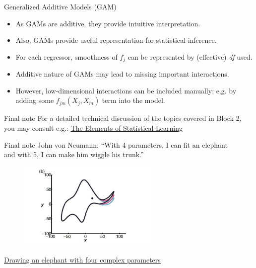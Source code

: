 \documentclass{beamer}
\begin{document}
\begin{frame}{Generalized Additive Models (GAM)}
\begin{itemize}
    \item[\ding{51}] As GAMs are additive, they provide intuitive interpretation. 
    \bigskip
    \item[\ding{51}] Also, GAMs provide useful representation for statistical inference.
    \bigskip
    \item[\ding{51}] For each regressor, smoothness of $f_j$ can be represented by (effective) \textit{df} used.
    \bigskip
    \item[\ding{55}] Additive nature of GAMs may lead to missing important interactions. 
    \bigskip 
    \item[\ding{51}] However, low-dimensional interactions can be included manually; e.g. by adding some $f_{jm}(X_j,X_m)$ term into the model.
\end{itemize}
\end{frame}
\begin{frame}{Final note}
\centering
For a detailed technical discussion of the topics covered in Block 2,\\ \medskip you may consult e.g.: \textcolor{blue}{\underline{\href{https://web.stanford.edu/~hastie/ElemStatLearn/}{The Elements of Statistical Learning}}}
\end{frame}
\begin{frame}[noframenumbering]{Final note }
John von Neumann: ``With 4 parameters, I can fit an elephant\\ and with 5, I can make him wiggle his trunk.''
\begin{figure}
  \includegraphics[width=0.6\textwidth]{IMG/Elephant.jpg}
\end{figure}
\centering
\textcolor{blue}{\underline{\href{https://fermatslibrary.com/s/drawing-an-elephant-with-four-complex-parameters}{Drawing an elephant with four complex parameters}}}
\end{frame}
\end{document}
